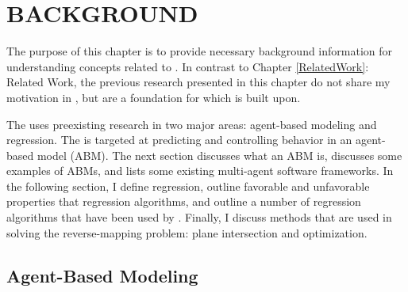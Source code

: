 \chapter{BACKGROUND}
\thispagestyle{plain}

\label{Background}

The purpose of this chapter is to provide necessary background information for understanding concepts related to \fw.
In contrast to Chapter \ref{RelatedWork}: Related Work, the previous research presented in this chapter do not share my motivation in \fw, but are a foundation for which \fw is built upon. 

The \framework uses preexisting research in two major areas:
agent-based modeling and regression.
The \fw is targeted at predicting and controlling behavior in an agent-based model (ABM).
The next section discusses what an ABM is, discusses some examples of ABMs, and lists some existing multi-agent software frameworks.
In the following section, I define regression, outline favorable and unfavorable properties that regression algorithms, and outline a number of regression algorithms that have been used by \fw.
Finally, I discuss methods that are used in solving the reverse-mapping problem: plane intersection and optimization.



\section{Agent-Based Modeling}

